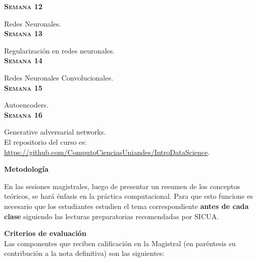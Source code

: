\documentclass[letterpaper,10pt,onecolumn]{article}
\begin{document}
\noindent\textbf{\textsc{Semana 12}}


Redes Neuronales. 
\\[-0.3cm]

\noindent\textbf{\textsc{Semana 13}}

Regularizaci\'on en redes neuronales. 
\\[-0.3cm]


\noindent\textbf{\textsc{Semana 14}}

Redes Neuronales Convolucionales. 
\\[-0.3cm]

\noindent\textbf{\textsc{Semana 15}}

Autoencoders. %
\\[-0.3cm]

\noindent\textbf{\textsc{Semana 16}}

Generative adversarial networks.
\\[0.1cm]


El repositorio del curso es:
\url{https://github.com/ComputoCienciasUniandes/IntroDataScience}.

\vspace*{0.5cm} 
\noindent\textbf{\large {} \quad
  Metodolog\'ia}\\[-0.2cm] 


\noindent\normalsize 

En las sesiones magistrales, luego de presentar un resumen de
los conceptos te\'oricos, se har\'a \'enfasis en la pr\'actica computacional.
Para que esto funcione es necesario que los estudiantes estudien el
tema correspondiente {\bf antes de cada clase} siguiendo las lecturas
preparatorias recomendadas por SICUA.

\vspace*{0.5cm} 
\noindent\textbf{\large {} \quad Criterios de
  evaluaci\'on}\\[-0.2cm] 

Las componentes que reciben calificaci\'on en la Magistral (en
par\'entesis su contribuci\'on a la nota definitiva) son las
siguientes:  
\end{document}
